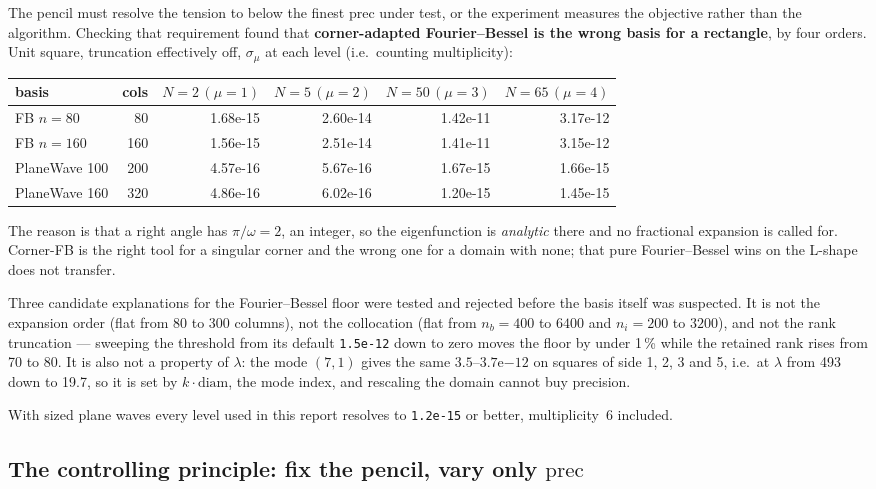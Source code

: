 \documentclass[11pt,a4paper]{article}
\newcommand{\pr}{\ensuremath{\mathrm{prec}}}
\newcommand{\lam}{\ensuremath{\lambda}}
\newcommand{\sig}{\ensuremath{\sigma}}
\begin{document}
The pencil must resolve the tension to below the finest $\pr$ under test, or the experiment
measures the objective rather than the algorithm. Checking that requirement found that
\textbf{corner-adapted Fourier--Bessel is the wrong basis for a rectangle}, by four orders.
Unit square, truncation effectively off, $\sig_\mu$ at each level (i.e.\ counting multiplicity):

\begin{center}
\begin{tabular}{lrrrrr}
\toprule
basis & cols & $N{=}2\,(\mu{=}1)$ & $N{=}5\,(\mu{=}2)$ & $N{=}50\,(\mu{=}3)$ & $N{=}65\,(\mu{=}4)$ \\
\midrule
FB $n{=}80$   &  80 & 1.68e-15 & 2.60e-14 & 1.42e-11 & 3.17e-12 \\
FB $n{=}160$  & 160 & 1.56e-15 & 2.51e-14 & 1.41e-11 & 3.15e-12 \\
PlaneWave 100 & 200 & 4.57e-16 & 5.67e-16 & 1.67e-15 & 1.66e-15 \\
PlaneWave 160 & 320 & 4.86e-16 & 6.02e-16 & 1.20e-15 & 1.45e-15 \\
\bottomrule
\end{tabular}
\end{center}

\noindent
The reason is that a right angle has $\pi/\omega = 2$, an integer, so the eigenfunction is
\emph{analytic} there and no fractional expansion is called for. Corner-FB is the right tool for
a singular corner and the wrong one for a domain with none; that pure Fourier--Bessel wins on
the L-shape does not transfer.

Three candidate explanations for the Fourier--Bessel floor were tested and rejected before the
basis itself was suspected. It is not the expansion order (flat from 80 to 300 columns), not the
collocation (flat from $n_b = 400$ to $6400$ and $n_i = 200$ to $3200$), and not the rank
truncation --- sweeping the threshold from its default \texttt{1.5e-12} down to zero moves the
floor by under 1\,\% while the retained rank rises from 70 to 80. It is also not a property of
$\lam$: the mode $(7,1)$ gives the same $3.5$--$3.7\mathrm{e}{-12}$ on squares of side 1, 2, 3
and 5, i.e.\ at $\lam$ from 493 down to 19.7, so it is set by $k\!\cdot\!\mathrm{diam}$, the mode
index, and rescaling the domain cannot buy precision.

With sized plane waves every level used in this report resolves to \texttt{1.2e-15} or better,
multiplicity~6 included.

\subsection{The controlling principle: fix the pencil, vary only \texorpdfstring{$\pr$}{prec}}
\end{document}
